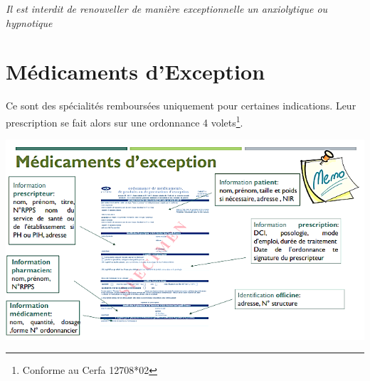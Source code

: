 \documentclass[11pt]{article}
\begin{document}
\emph{Il est interdit de renouveller de manière exceptionnelle un anxiolytique ou hypnotique}

\section{Médicaments d'Exception}
\label{sec:org6b1ab79}
Ce sont des spécialités remboursées uniquement pour certaines indications.
Leur prescription se fait alors sur une ordonnance 4 volets\footnote{Conforme au Cerfa 12708*02}.

\begin{center}
\includegraphics[width=.9\linewidth]{./exception.png}
\end{center}
\end{document}
